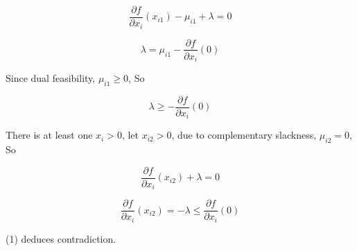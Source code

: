 \[
\frac{\partial f}{\partial x_i}(x_{i1}) - \mu_{i1} + \lambda = 0
\]

\[
\lambda = \mu_{i1} - \frac{\partial f}{\partial x_i}(0)
\]

Since dual feasibility, $\mu_{i1} \geq 0$, So

\[
\lambda \geq - \frac{\partial f}{\partial x_i}(0)
\]

There is at least one $x_i > 0$, let $x_{i2} > 0$, due to complementary slackness, $\mu_{i2} = 0$, So

\[
\frac{\partial f}{\partial x_i}(x_{i2}) + \lambda = 0
\]

\[
\frac{\partial f}{\partial x_i}(x_{i2}) = - \lambda \leq \frac{\partial f}{\partial x_i}(0)
\]

(1) deduces contradiction.